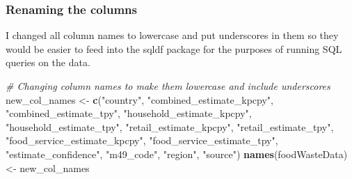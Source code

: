 \documentclass[
]{article}
\newenvironment{Shaded}{\begin{snugshade}}{\end{snugshade}}
\newcommand{\AttributeTok}[1]{\textcolor[rgb]{0.13,0.29,0.53}{#1}}
\newcommand{\CommentTok}[1]{\textcolor[rgb]{0.56,0.35,0.01}{\textit{#1}}}
\newcommand{\DecValTok}[1]{\textcolor[rgb]{0.00,0.00,0.81}{#1}}
\newcommand{\FunctionTok}[1]{\textcolor[rgb]{0.13,0.29,0.53}{\textbf{#1}}}
\newcommand{\NormalTok}[1]{#1}
\newcommand{\OtherTok}[1]{\textcolor[rgb]{0.56,0.35,0.01}{#1}}
\newcommand{\SpecialCharTok}[1]{\textcolor[rgb]{0.81,0.36,0.00}{\textbf{#1}}}
\newcommand{\StringTok}[1]{\textcolor[rgb]{0.31,0.60,0.02}{#1}}
\begin{document}
\begin{Shaded}
\end{Shaded}

\hypertarget{renaming-the-columns}{%
\subsubsection{Renaming the columns}\label{renaming-the-columns}}

I changed all column names to lowercase and put underscores in them so
they would be easier to feed into the sqldf package for the purposes of
running SQL queries on the data.

\begin{Shaded}
\begin{Highlighting}[]
\CommentTok{\# Changing column names to make them lowercase and include underscores}
\NormalTok{new\_col\_names }\OtherTok{\textless{}{-}} \FunctionTok{c}\NormalTok{(}\StringTok{"country"}\NormalTok{, }\StringTok{"combined\_estimate\_kpcpy"}\NormalTok{, }\StringTok{"combined\_estimate\_tpy"}\NormalTok{, }\StringTok{"household\_estimate\_kpcpy"}\NormalTok{, }\StringTok{"household\_estimate\_tpy"}\NormalTok{, }\StringTok{"retail\_estimate\_kpcpy"}\NormalTok{, }\StringTok{"retail\_estimate\_tpy"}\NormalTok{, }\StringTok{"food\_service\_estimate\_kpcpy"}\NormalTok{, }\StringTok{"food\_service\_estimate\_tpy"}\NormalTok{, }\StringTok{"estimate\_confidence"}\NormalTok{, }\StringTok{"m49\_code"}\NormalTok{, }\StringTok{"region"}\NormalTok{, }\StringTok{"source"}\NormalTok{)}
\FunctionTok{names}\NormalTok{(foodWasteData) }\OtherTok{\textless{}{-}}\NormalTok{ new\_col\_names}
\end{Highlighting}
\end{Shaded}
\end{document}
